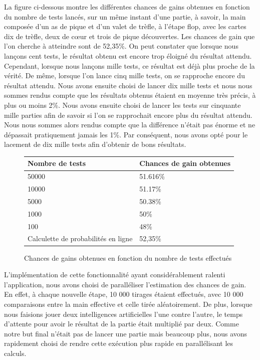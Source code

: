 \documentclass{report}
\begin{document}
La figure ci-dessous montre les différentes chances de gains obtenues en fonction du nombre de tests lancés, sur un même instant d'une partie, à savoir, la main composée d'un as de pique et d'un valet de trèfle, à l'étape flop, avec les cartes dix de trèfle, deux de cœur et trois de pique découvertes. Les chances de gain que l'on cherche à atteindre sont de 52,35\%. On peut constater que lorsque nous lançons cent tests, le résultat obtenu est encore trop éloigné du résultat attendu. Cependant, lorsque nous lançons mille tests, ce résultat est déjà plus proche de la vérité. De même, lorsque l'on lance cinq mille tests, on se rapproche encore du résultat attendu. Nous avons ensuite choisi de lancer dix mille tests et nous nous sommes rendus compte que les résultats obtenus étaient en moyenne très précis, à plus ou moins 2\%. Nous avons ensuite choisi de lancer les tests sur cinquante mille parties afin de savoir si l'on se rapprochait encore plus du résultat attendu. Nous nous sommes alors rendus compte que la différence n'était pas énorme et ne dépassait pratiquement jamais les 1\%. Par conséquent, nous avons opté pour le lacement de dix mille tests afin d'obtenir de bons résultats.\\

\begin{figure}[H]
\begin{center}
\begin{tabular}{|l|l|}
\hline
Nombre de tests & Chances de gain obtenues\\
\hline
50000  & 51.616\%\\
\hline
10000 & 51.17\%\\
\hline
5000 & 50.38\%\\
\hline
1000 & 50\%\\
\hline
100 & 48\%\\
\hline
Calculette de probabilités en ligne & 52,35\%\\
\hline
\end{tabular}
\end{center}
\caption{Chances de gains obtenues en fonction du nombre de tests effectués}
\end{figure}


L'implémentation de cette fonctionnalité ayant considérablement ralenti l'application, nous avons choisi de paralléliser l'estimation des chances de gain. En effet, à chaque nouvelle étape, 10 000 tirages étaient effectués, avec 10 000 comparaisons entre la main effective et celle tirée aléatoirement. De plus, lorsque nous faisions jouer deux intelligences artificielles l'une contre l'autre, le temps d'attente pour avoir le résultat de la partie était multiplié par deux. Comme notre but final n'était pas de lancer une partie mais beaucoup plus, nous avons rapidement choisi de rendre cette exécution plus rapide en parallélisant les calculs.\par
\end{document}
